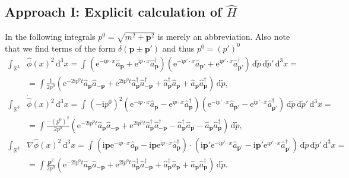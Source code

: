 \documentclass[english, parskip=full]{scrartcl}
\newcommand{\intx}{}
\newcommand{\intr}{}
\renewcommand{\i}{\text{i}}
\newcommand{\e}{\text{e}}
\begin{document}
\subsection*{Approach I: Explicit calculation of $\hat{H}$}
In the following integrals $p^0 = \sqrt{m^2 + \textbf{p}^2}$ is merely an abbreviation.
Also note that we find terms of the form $\delta(\textbf{p} \pm \textbf{p}')$ and thus $p^0 = (p')^0$
\begin{align}
\intr\int_{\mathbb{R}^{3}} &\hat{\phi}(x)^2 \, \mathrm{d}^{3}x = \intx\int_{ }^{ } \left( \e^{-\i p\cdot x} \hat{a}_\textbf{p} + \e^{\i p\cdot x} \hat{a}_\textbf{p}^\dagger \right) \left( \e^{-\i p'\cdot x} \hat{a}_{\textbf{p}'} + \e^{\i p'\cdot x} \hat{a}_{\textbf{p}'}^\dagger \right) \, \mathrm{d}\tilde{p}\, \mathrm{d}\tilde{p}'\, \mathrm{d}^{3}x = \\
&= \int \frac{1}{2p^0} \left( \e^{-2\i p^0t} \hat{a}_\textbf{p} \hat{a}_{-\textbf{p}} + \e^{2\i p^0 t} \hat{a}_\textbf{p}^\dagger \hat{a}_{-\textbf{p}}^\dagger + \hat{a}_\textbf{p}^\dagger \hat{a}_\textbf{p} + \hat{a}_\textbf{p} \hat{a}_\textbf{p}^\dagger \right)\, \mathrm{d}\tilde{p},\\
\intr\int_{\mathbb{R}^{3}} &\dot{\hat{\phi}}(x)^2 \, \mathrm{d}^{3}x =  \int_{ }^{ } (-\i p^0)^2 \left( \e^{-\i p\cdot x} \hat{a}_\textbf{p} - \e^{\i p\cdot x} \hat{a}_\textbf{p}^\dagger \right) \left( \e^{-\i p'\cdot x} \hat{a}_{\textbf{p}'} - \e^{\i p'\cdot x} \hat{a}_{\textbf{p}'}^\dagger \right) \, \mathrm{d}\tilde{p}\, \mathrm{d}\tilde{p}'\, \mathrm{d}^{3}x = \\
&= \int \frac{-(p^0)^2}{2p^0} \left( \e^{-2\i p^0t} \hat{a}_\textbf{p} \hat{a}_{-\textbf{p}} + \e^{2\i p^0 t} \hat{a}_\textbf{p}^\dagger \hat{a}_{-\textbf{p}}^\dagger - \hat{a}_\textbf{p}^\dagger \hat{a}_\textbf{p} - \hat{a}_\textbf{p} \hat{a}_\textbf{p}^\dagger \right)\, \mathrm{d}\tilde{p},\\
\intr\int_{\mathbb{R}^{3}} &\nabla\hat{\phi}(x)^2 \, \mathrm{d}^{3}x =  \int_{ }^{ } \left( \i \textbf{p} \e^{-\i p\cdot x} \hat{a}_\textbf{p} - \i\textbf{p} \e^{\i p\cdot x} \hat{a}_\textbf{p}^\dagger \right) \cdot \left( \i\textbf{p}' \e^{-\i p'\cdot x} \hat{a}_{\textbf{p}'} - \i\textbf{p}' \e^{\i p'\cdot x} \hat{a}_{\textbf{p}'}^\dagger \right) \, \mathrm{d}\tilde{p}\, \mathrm{d}\tilde{p}'\, \mathrm{d}^{3}x = \\
&= \int \frac{\textbf{p}^2}{2p^0} \left( \e^{-2\i p^0t} \hat{a}_\textbf{p} \hat{a}_{-\textbf{p}} + \e^{2\i p^0 t} \hat{a}_\textbf{p}^\dagger \hat{a}_{-\textbf{p}}^\dagger + \hat{a}_\textbf{p}^\dagger \hat{a}_\textbf{p} + \hat{a}_\textbf{p} \hat{a}_\textbf{p}^\dagger \right)\, \mathrm{d}\tilde{p}.
\end{align}
\end{document}
